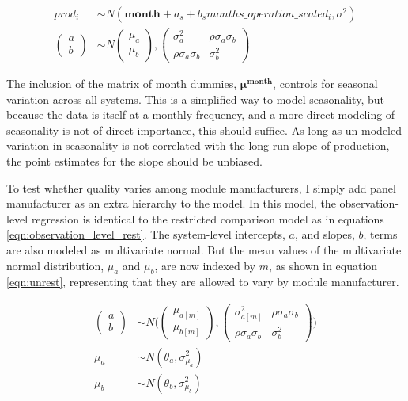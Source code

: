 \documentclass[a4paper]{article}
\begin{document}
\begin{equation}
\begin{aligned}
prod_{i} &\sim N(\mathbf{month} + a_s + b_s months\_operation\_scaled_{i}, \sigma^2)\\
\begin{pmatrix}
  a\\
  b
\end{pmatrix}
&\sim N
\begin{pmatrix}
  \mu_a\\
  \mu_b
\end{pmatrix},
\begin{pmatrix}
  \sigma_a^2 & \rho \sigma_a \sigma_b \\
  \rho \sigma_a \sigma_b & \sigma_b^2
\end{pmatrix}\label{eqn:observation_level_rest}
\end{aligned}
\end{equation}

The inclusion of the matrix of month dummies, $\mathbf{\mu^{month}}$, controls for seasonal variation across all systems. This is a simplified way to model seasonality, but because the data is itself at a monthly frequency, and a more direct modeling of seasonality is not of direct importance, this should suffice. As long as un-modeled variation in seasonality is not correlated with the long-run slope of production, the point estimates for the slope should be unbiased.

To test whether quality varies among module manufacturers, I simply add panel manufacturer as an extra hierarchy to the model. In this model, the observation-level regression is identical to the restricted comparison model as in equations \ref{eqn:observation_level_rest}. The system-level intercepts, $a$, and slopes, $b$, terms are also modeled as multivariate normal. But the mean values of the multivariate normal distribution, $\mu_a$ and $\mu_b$, are now indexed by $m$, as shown in equation \ref{eqn:unrest}, representing that they are allowed to vary by module manufacturer.

\begin{equation}
\begin{aligned}
\begin{pmatrix}
  a\\
  b
\end{pmatrix}
&\sim N \Bigg(
\begin{pmatrix}
  \mu_{a[m]}\\
  \mu_{b[m]}
\end{pmatrix},
\begin{pmatrix}
  \sigma_{a[m]}^2 & \rho \sigma_{a} \sigma_{b} \\
  \rho \sigma_a \sigma_b & \sigma_b^2
\end{pmatrix} \Bigg) \\
\mu_{a} &\sim N(\theta_a, \sigma_{\mu_a}^2) \\
\mu_{b} & \sim N(\theta_b, \sigma_{\mu_b}^2) \label{eqn:unrest}
\end{aligned}
\end{equation}
\end{document}
